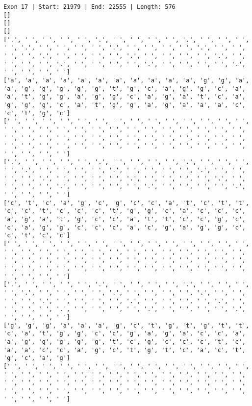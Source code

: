 \documentclass{article}
\begin{document}
\begin{Verbatim}
Exon 17 | Start: 21979 | End: 22555 | Length: 576
[]
[]
[]
['.', ' ', ' ', ' ', ' ', '.', ' ', ' ', ' ', ' ', '.', ' ', ' ', ' ', ' ', '.', ' ', ' ', ' ', ' ', '.', ' ', ' ', ' ', ' ', '.', ' ', ' ', ' ', ' ', '.', ' ', ' ', ' ', ' ', '.', ' ', ' ', ' ', ' ', '.', ' ', ' ', ' ', ' ', '.', ' ', ' ', ' ', ' ', '.', ' ', ' ', ' ', ' ', '.', ' ', ' ', ' ', ' ']
['a', 'a', 'a', 'a', 'a', 'a', 'a', 'a', 'a', 'a', 'a', 'g', 'g', 'a', 'a', 'g', 'g', 'g', 'g', 'g', 't', 'g', 'c', 'a', 'g', 'g', 'c', 'a', 'a', 't', 'g', 'g', 'a', 'g', 'g', 'c', 'a', 'g', 'a', 't', 'c', 'a', 'g', 'g', 'g', 'c', 'a', 't', 'g', 'g', 'a', 'g', 'a', 'a', 'a', 'c', 'c', 't', 'g', 'c']
[' ', ' ', ' ', ' ', ' ', ' ', ' ', ' ', ' ', ' ', ' ', ' ', ' ', ' ', ' ', ' ', ' ', ' ', ' ', ' ', ' ', ' ', ' ', ' ', ' ', ' ', ' ', ' ', ' ', ' ', ' ', ' ', ' ', ' ', ' ', ' ', ' ', ' ', ' ', ' ', ' ', ' ', ' ', ' ', ' ', ' ', ' ', ' ', ' ', ' ', ' ', ' ', ' ', ' ', ' ', ' ', ' ', ' ', ' ', ' ']
['.', ' ', ' ', ' ', ' ', '.', ' ', ' ', ' ', ' ', '.', ' ', ' ', ' ', ' ', '.', ' ', ' ', ' ', ' ', '.', ' ', ' ', ' ', ' ', '.', ' ', ' ', ' ', ' ', '.', ' ', ' ', ' ', ' ', '.', ' ', ' ', ' ', ' ', '.', ' ', ' ', ' ', ' ', '.', ' ', ' ', ' ', ' ', '.', ' ', ' ', ' ', ' ', '.', ' ', ' ', ' ', ' ']
['c', 't', 'c', 'a', 'g', 'c', 'g', 'c', 'c', 'a', 't', 'c', 't', 't', 'c', 'c', 't', 'c', 'c', 'c', 't', 'g', 'g', 'c', 'a', 'c', 'c', 'c', 'a', 'g', 'a', 't', 'g', 'c', 'c', 'a', 't', 't', 'c', 'c', 'g', 'c', 'c', 'a', 'g', 'g', 'c', 'c', 'c', 'a', 'c', 'g', 'a', 'g', 'g', 'c', 'c', 't', 'c', 'c']
[' ', ' ', ' ', ' ', ' ', ' ', ' ', ' ', ' ', ' ', ' ', ' ', ' ', ' ', ' ', ' ', ' ', ' ', ' ', ' ', ' ', ' ', ' ', ' ', ' ', ' ', ' ', ' ', ' ', ' ', ' ', ' ', ' ', ' ', ' ', ' ', ' ', ' ', ' ', ' ', ' ', ' ', ' ', ' ', ' ', ' ', ' ', ' ', ' ', ' ', ' ', ' ', ' ', ' ', ' ', ' ', ' ', ' ', ' ', ' ']
['.', ' ', ' ', ' ', ' ', '.', ' ', ' ', ' ', ' ', '.', ' ', ' ', ' ', ' ', '.', ' ', ' ', ' ', ' ', '.', ' ', ' ', ' ', ' ', '.', ' ', ' ', ' ', ' ', '.', ' ', ' ', ' ', ' ', '.', ' ', ' ', ' ', ' ', '.', ' ', ' ', ' ', ' ', '.', ' ', ' ', ' ', ' ', '.', ' ', ' ', ' ', ' ', '.', ' ', ' ', ' ', ' ']
['g', 'g', 'g', 'a', 'a', 'a', 'g', 'c', 't', 'g', 't', 'g', 't', 't', 'c', 'a', 't', 'g', 'g', 'c', 'c', 'g', 'a', 'g', 'a', 'c', 'c', 'a', 'a', 'g', 'g', 'g', 'g', 'g', 't', 'c', 'g', 'c', 'c', 'c', 't', 'c', 'a', 'a', 'c', 'c', 'a', 'g', 'c', 't', 'g', 't', 'c', 'a', 'c', 't', 'g', 'c', 'a', 'g']
[' ', ' ', ' ', ' ', ' ', ' ', ' ', ' ', ' ', ' ', ' ', ' ', ' ', ' ', ' ', ' ', ' ', ' ', ' ', ' ', ' ', ' ', ' ', ' ', ' ', ' ', ' ', ' ', ' ', ' ', ' ', ' ', ' ', ' ', ' ', ' ', ' ', ' ', ' ', ' ', ' ', ' ', ' ', ' ', ' ', ' ', ' ', ' ', ' ', ' ', ' ', ' ', ' ', ' ', ' ', ' ', ' ', ' ', ' ', ' ']

\end{Verbatim}
\end{document}
